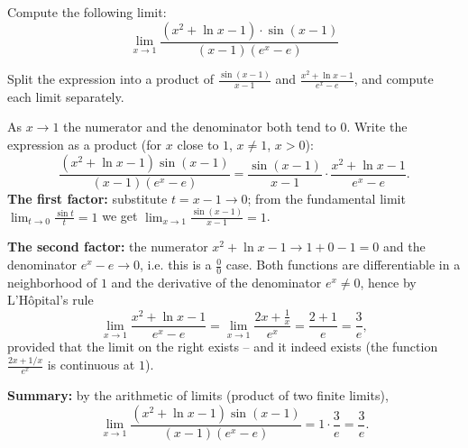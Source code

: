
\begin{question}
Compute the following limit:
\[ \lim_{x\to 1}\frac{(x^2+\ln x-1)\cdot\sin(x-1)}{(x-1)(e^x-e)} \]
\end{question}

\begin{hint}
Split the expression into a product of $\frac{\sin(x-1)}{x-1}$ and $\frac{x^2+\ln x-1}{e^x-e}$, and compute each limit separately.
\end{hint}

\begin{solution}
As $x\to1$ the numerator and the denominator both tend to $0$. Write the expression as a product (for $x$ close to $1$, $x\neq1$, $x>0$):
\[ \frac{(x^2+\ln x-1)\sin(x-1)}{(x-1)(e^x-e)}=\frac{\sin(x-1)}{x-1}\cdot\frac{x^2+\ln x-1}{e^x-e}. \]
\textbf{The first factor:} substitute $t=x-1\to0$; from the fundamental limit $\lim_{t\to0}\frac{\sin t}{t}=1$ we get $\lim_{x\to1}\frac{\sin(x-1)}{x-1}=1$.

\textbf{The second factor:} the numerator $x^2+\ln x-1\to 1+0-1=0$ and the denominator $e^x-e\to0$, i.e. this is a $\frac00$ case. Both functions are differentiable in a neighborhood of $1$ and the derivative of the denominator $e^x\neq0$, hence by L'Hôpital's rule
\[ \lim_{x\to1}\frac{x^2+\ln x-1}{e^x-e}=\lim_{x\to1}\frac{2x+\frac1x}{e^x}=\frac{2+1}{e}=\frac3e, \]
provided that the limit on the right exists -- and it indeed exists (the function $\frac{2x+1/x}{e^x}$ is continuous at $1$).

\textbf{Summary:} by the arithmetic of limits (product of two finite limits),
\[ \lim_{x\to 1}\frac{(x^2+\ln x-1)\sin(x-1)}{(x-1)(e^x-e)}=1\cdot\frac3e=\boxed{\frac3e}. \]
\end{solution}
